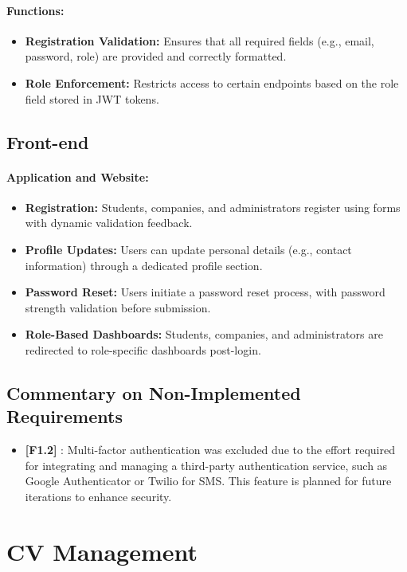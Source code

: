 \paragraph{Functions:}
\begin{itemize}
    \item \textbf{Registration Validation:} Ensures that all required fields (e.g., email, password, role) are provided and correctly formatted.
    \item \textbf{Role Enforcement:} Restricts access to certain endpoints based on the role field stored in JWT tokens.
\end{itemize}

\subsection*{Front-end}
\paragraph{Application and Website:}
\begin{itemize}
    \item \textbf{Registration:} Students, companies, and administrators register using forms with dynamic validation feedback.
    \item \textbf{Profile Updates:} Users can update personal details (e.g., contact information) through a dedicated profile section.
    \item \textbf{Password Reset:} Users initiate a password reset process, with password strength validation before submission.
    \item \textbf{Role-Based Dashboards:} Students, companies, and administrators are redirected to role-specific dashboards post-login.
\end{itemize}

\subsection*{Commentary on Non-Implemented Requirements}
\begin{itemize}
    \item \textbf{[F1.2]} : Multi-factor authentication was excluded due to the effort required for integrating and managing a third-party authentication service, such as Google Authenticator or Twilio for SMS. This feature is planned for future iterations to enhance security.
\end{itemize}

\section{CV Management}

